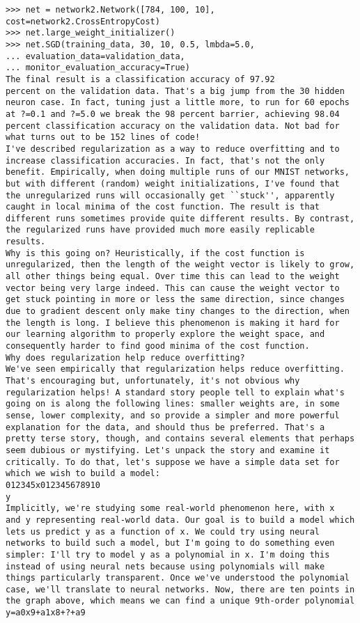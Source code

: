 \begin{lstlisting}
>>> net = network2.Network([784, 100, 10], cost=network2.CrossEntropyCost)
>>> net.large_weight_initializer()
>>> net.SGD(training_data, 30, 10, 0.5, lmbda=5.0,
... evaluation_data=validation_data,
... monitor_evaluation_accuracy=True)
The final result is a classification accuracy of 97.92
percent on the validation data. That's a big jump from the 30 hidden neuron case. In fact, tuning just a little more, to run for 60 epochs at ?=0.1 and ?=5.0 we break the 98 percent barrier, achieving 98.04
percent classification accuracy on the validation data. Not bad for what turns out to be 152 lines of code!
I've described regularization as a way to reduce overfitting and to increase classification accuracies. In fact, that's not the only benefit. Empirically, when doing multiple runs of our MNIST networks, but with different (random) weight initializations, I've found that the unregularized runs will occasionally get ``stuck'', apparently caught in local minima of the cost function. The result is that different runs sometimes provide quite different results. By contrast, the regularized runs have provided much more easily replicable results.
Why is this going on? Heuristically, if the cost function is unregularized, then the length of the weight vector is likely to grow, all other things being equal. Over time this can lead to the weight vector being very large indeed. This can cause the weight vector to get stuck pointing in more or less the same direction, since changes due to gradient descent only make tiny changes to the direction, when the length is long. I believe this phenomenon is making it hard for our learning algorithm to properly explore the weight space, and consequently harder to find good minima of the cost function.
Why does regularization help reduce overfitting?
We've seen empirically that regularization helps reduce overfitting. That's encouraging but, unfortunately, it's not obvious why regularization helps! A standard story people tell to explain what's going on is along the following lines: smaller weights are, in some sense, lower complexity, and so provide a simpler and more powerful explanation for the data, and should thus be preferred. That's a pretty terse story, though, and contains several elements that perhaps seem dubious or mystifying. Let's unpack the story and examine it critically. To do that, let's suppose we have a simple data set for which we wish to build a model:
012345x012345678910
y
Implicitly, we're studying some real-world phenomenon here, with x
and y representing real-world data. Our goal is to build a model which lets us predict y as a function of x. We could try using neural networks to build such a model, but I'm going to do something even simpler: I'll try to model y as a polynomial in x. I'm doing this instead of using neural nets because using polynomials will make things particularly transparent. Once we've understood the polynomial case, we'll translate to neural networks. Now, there are ten points in the graph above, which means we can find a unique 9th-order polynomial y=a0x9+a1x8+?+a9

\end{lstlisting}
